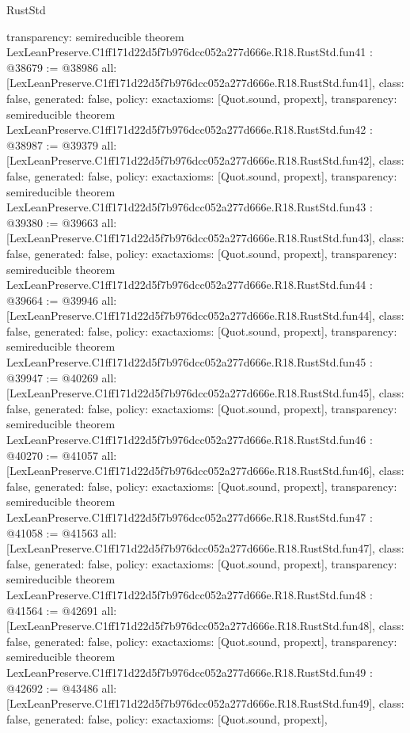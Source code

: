 \begin{lexlean}{RustStd}
\begin{coremodule}
{  transparency: semireducible
}
theorem LexLeanPreserve.C1ff171d22d5f7b976dcc052a277d666e.R18.RustStd.fun41 : @38679 := @38986 {
  all: [LexLeanPreserve.C1ff171d22d5f7b976dcc052a277d666e.R18.RustStd.fun41],
  class: false,
  generated: false,
  policy: exact{axioms: [Quot.sound, propext]},
  transparency: semireducible
}
theorem LexLeanPreserve.C1ff171d22d5f7b976dcc052a277d666e.R18.RustStd.fun42 : @38987 := @39379 {
  all: [LexLeanPreserve.C1ff171d22d5f7b976dcc052a277d666e.R18.RustStd.fun42],
  class: false,
  generated: false,
  policy: exact{axioms: [Quot.sound, propext]},
  transparency: semireducible
}
theorem LexLeanPreserve.C1ff171d22d5f7b976dcc052a277d666e.R18.RustStd.fun43 : @39380 := @39663 {
  all: [LexLeanPreserve.C1ff171d22d5f7b976dcc052a277d666e.R18.RustStd.fun43],
  class: false,
  generated: false,
  policy: exact{axioms: [Quot.sound, propext]},
  transparency: semireducible
}
theorem LexLeanPreserve.C1ff171d22d5f7b976dcc052a277d666e.R18.RustStd.fun44 : @39664 := @39946 {
  all: [LexLeanPreserve.C1ff171d22d5f7b976dcc052a277d666e.R18.RustStd.fun44],
  class: false,
  generated: false,
  policy: exact{axioms: [Quot.sound, propext]},
  transparency: semireducible
}
theorem LexLeanPreserve.C1ff171d22d5f7b976dcc052a277d666e.R18.RustStd.fun45 : @39947 := @40269 {
  all: [LexLeanPreserve.C1ff171d22d5f7b976dcc052a277d666e.R18.RustStd.fun45],
  class: false,
  generated: false,
  policy: exact{axioms: [Quot.sound, propext]},
  transparency: semireducible
}
theorem LexLeanPreserve.C1ff171d22d5f7b976dcc052a277d666e.R18.RustStd.fun46 : @40270 := @41057 {
  all: [LexLeanPreserve.C1ff171d22d5f7b976dcc052a277d666e.R18.RustStd.fun46],
  class: false,
  generated: false,
  policy: exact{axioms: [Quot.sound, propext]},
  transparency: semireducible
}
theorem LexLeanPreserve.C1ff171d22d5f7b976dcc052a277d666e.R18.RustStd.fun47 : @41058 := @41563 {
  all: [LexLeanPreserve.C1ff171d22d5f7b976dcc052a277d666e.R18.RustStd.fun47],
  class: false,
  generated: false,
  policy: exact{axioms: [Quot.sound, propext]},
  transparency: semireducible
}
theorem LexLeanPreserve.C1ff171d22d5f7b976dcc052a277d666e.R18.RustStd.fun48 : @41564 := @42691 {
  all: [LexLeanPreserve.C1ff171d22d5f7b976dcc052a277d666e.R18.RustStd.fun48],
  class: false,
  generated: false,
  policy: exact{axioms: [Quot.sound, propext]},
  transparency: semireducible
}
theorem LexLeanPreserve.C1ff171d22d5f7b976dcc052a277d666e.R18.RustStd.fun49 : @42692 := @43486 {
  all: [LexLeanPreserve.C1ff171d22d5f7b976dcc052a277d666e.R18.RustStd.fun49],
  class: false,
  generated: false,
  policy: exact{axioms: [Quot.sound, propext]},
}
\end{coremodule}
\end{lexlean}
